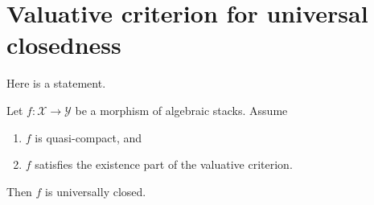 \section{Valuative criterion for universal closedness}
\label{section-valutive-criterion}

\noindent
Here is a statement.

\begin{lemma}
\label{lemma-quasi-compact-existence-universally-closed}
Let $f : \mathcal{X} \to \mathcal{Y}$ be a morphism of algebraic stacks.
Assume
\begin{enumerate}
\item $f$ is quasi-compact, and
\item $f$ satisfies the existence part of the valuative criterion.
\end{enumerate}
Then $f$ is universally closed.
\end{lemma}

